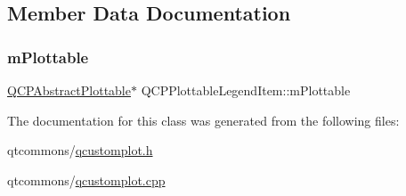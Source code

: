 \subsection{Member Data Documentation}
\mbox{\label{class_q_c_p_plottable_legend_item_ada647fb4b22971a1a424e15b4f6af0d9}} 
\subsubsection{\texorpdfstring{mPlottable}{mPlottable}}
{\footnotesize\ttfamily \mbox{\hyperlink{class_q_c_p_abstract_plottable}{Q\+C\+P\+Abstract\+Plottable}}$\ast$ Q\+C\+P\+Plottable\+Legend\+Item\+::m\+Plottable\hspace{0.3cm}{\ttfamily [protected]}}



The documentation for this class was generated from the following files\+:\begin{DoxyCompactItemize}
\item 
qtcommons/\mbox{\hyperlink{qcustomplot_8h}{qcustomplot.\+h}}\item 
qtcommons/\mbox{\hyperlink{qcustomplot_8cpp}{qcustomplot.\+cpp}}\end{DoxyCompactItemize}
